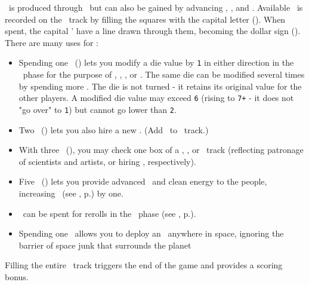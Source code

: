 \currency\ is produced through \factories\ but can also be gained by advancing \trade, \tech, and \culture.  
Available \currency\ is recorded on the \currency\ track by filling the squares with the capital letter (\gaincurrency). 
When spent, the capital \gaincurrency' have a line drawn through them, becoming the dollar sign (\spendcurrency).
There are many uses for \currency:
\begin{itemize}
  \item Spending one \currency\ (\spendcurrency) lets you modify a die value by \texttt{1} in either direction in the \development\ phase for the purpose of \construction, \activation, \trade, or \culture.  The same die can be modified several times by spending more \currency.  The die is not turned - it retains its original value for the other players.  A modified die value may exceed \texttt{6} (rising to \texttt{7+} - it does not "go over" to \texttt{1}) but cannot go lower than \texttt{2}.
  \item Two \currency\ (\spendcurrency\spendcurrency) lets you also hire a new \astronaut.  (Add \gainastronautsymbol\ to \population\ track.)
  \item With three \currency\ (\spendcurrency\spendcurrency\spendcurrency), you may check one box of a \tech, \culture, or \military\ track (reflecting patronage of scientists and artists, or hiring \pilots, respectively).
  \item Five \currency\ (\spendcurrency\spendcurrency\spendcurrency\spendcurrency\spendcurrency) lets you provide advanced \tech\ and clean energy to the people, increasing \happiness\ (see , p.\pageref{sec:happiness}) by one.
  \item \currency\ can be spent for rerolls in the \diplomacy\ phase (see , p.\pageref{sec:diplomacy}).
  \item Spending one \currency\ allows you to deploy an \armament\ anywhere in space, ignoring the barrier of space junk that surrounds the planet
\end{itemize}
Filling the entire \currency\ track triggers the end of the game and provides a scoring bonus.
